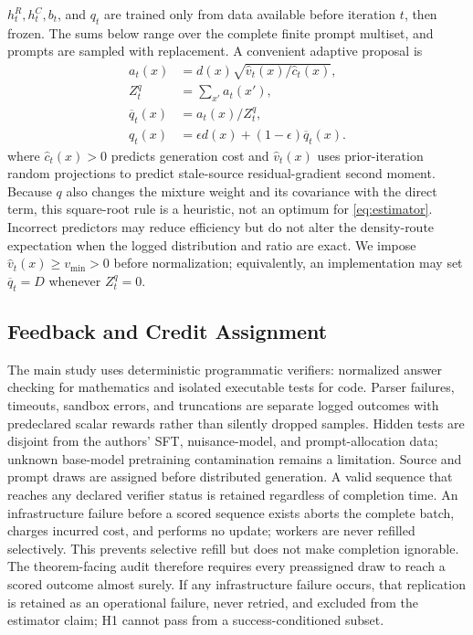 \documentclass{article}
\begin{document}
$h_t^R,h_t^C,b_t$, and $q_t$ are trained only from data available before iteration
$t$, then frozen. The sums below range over the complete finite prompt
multiset, and prompts are sampled with replacement. A convenient adaptive proposal is
\begin{align}
a_t(x)&=d(x)\sqrt{\widehat v_t(x)/\widehat c_t(x)},\\
Z_t^q&=\sum_{x'}a_t(x'),\\
\overline q_t(x)&=a_t(x)/Z_t^q,\\
q_t(x)&=\epsilon d(x)+(1-\epsilon)\overline q_t(x).
\end{align}
where $\widehat c_t(x)>0$ predicts generation cost and $\widehat v_t(x)$ uses
prior-iteration random projections to predict stale-source residual-gradient
second moment. Because $q$ also changes the mixture weight and its covariance
with the direct term, this square-root rule is a heuristic, not an optimum for
\cref{eq:estimator}. Incorrect predictors may reduce efficiency but do not
alter the density-route expectation when the logged distribution and ratio are
exact.
We impose $\widehat v_t(x)\ge v_{\min}>0$ before normalization; equivalently,
an implementation may set $\overline q_t=D$ whenever $Z_t^q=0$.

\subsection{Feedback and Credit Assignment}

The main study uses deterministic programmatic verifiers: normalized answer
checking for mathematics and isolated executable tests for code. Parser
failures, timeouts, sandbox errors, and truncations are separate logged outcomes
with predeclared scalar rewards rather than silently dropped samples. Hidden
tests are disjoint from the authors' SFT, nuisance-model, and prompt-allocation
data; unknown base-model pretraining contamination remains a limitation.
Source and prompt draws are assigned before distributed generation. A valid
sequence that reaches any declared verifier status is retained regardless of
completion time. An infrastructure failure before a scored sequence exists
aborts the complete batch, charges incurred cost, and performs no update;
workers are never refilled selectively.
This prevents selective refill but does not make completion ignorable. The
theorem-facing audit therefore requires every preassigned draw to reach a
scored outcome almost surely. If any infrastructure failure occurs, that
replication is retained as an operational failure, never retried, and excluded
from the estimator claim; H1 cannot pass from a success-conditioned subset.
\end{document}
